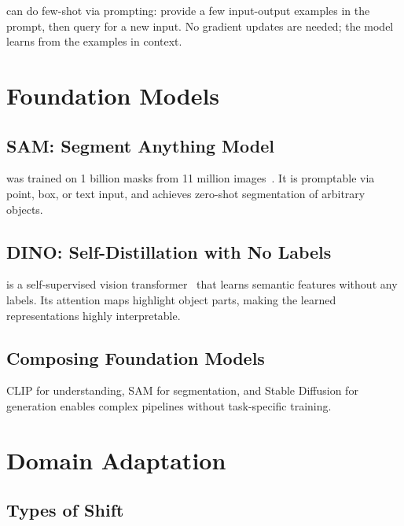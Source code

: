  can do few-shot via prompting: provide a few input-output examples in the prompt, then query for a new input. No gradient updates are needed; the model learns from the examples in context.


\section{Foundation Models}


\subsection{SAM: Segment Anything Model}

 was trained on 1 billion masks from 11 million images~\cite{Kirillov2023SAM}. It is promptable via point, box, or text input, and achieves zero-shot segmentation of arbitrary objects.

\subsection{DINO: Self-Distillation with No Labels}

 is a self-supervised vision transformer~\cite{Caron2021DINO} that learns semantic features without any labels. Its attention maps highlight object parts, making the learned representations highly interpretable.

\subsection{Composing Foundation Models}

 CLIP for understanding, SAM for segmentation, and Stable Diffusion for generation enables complex pipelines without task-specific training.


\section{Domain Adaptation}


\subsection{Types of Shift}

